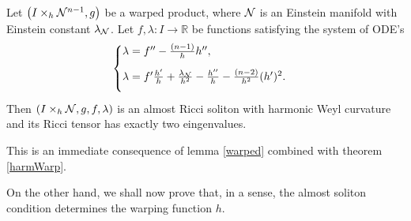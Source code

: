 \begin{teorema}\label{T31}
    Let $\left(I \times_{h} \mathcal{N}^{n-1}, g\right)$ be a warped product, where $\mathcal{N}$ is an Einstein manifold with Einstein constant $\lambda_{\mathcal{N}}$. Let $f,\lambda:I\rightarrow\mathbb{R}$ be functions satisfying the system of ODE's
    \begin{equation}\label{SistemaSimples} 
		\begin{cases}
		\lambda = f'' - \frac{(n-1)}{h} h'' \vspace{0.3cm},\\
		\lambda = f' \frac{h'}{h} + \frac{\lambda_{\nn}}{h^2} - \frac{h''}{h} - \frac{(n-2)}{h^2} (h')^2 \vspace{0.3cm} .
		\end{cases}
    \end{equation} 
    Then $\left(I \times_{h} \mathcal{N}, g, f,\lambda\right)$ is an almost Ricci soliton with harmonic Weyl curvature and its Ricci tensor has exactly two eingenvalues. \\
\end{teorema}

\begin{demm}
	This is an immediate consequence of lemma \cref{warped} combined with theorem \cref{harmWarp}. \\
	\end{demm}

On the other hand, we shall now prove that, in a sense, the almost soliton condition determines the warping function $h$. \\

